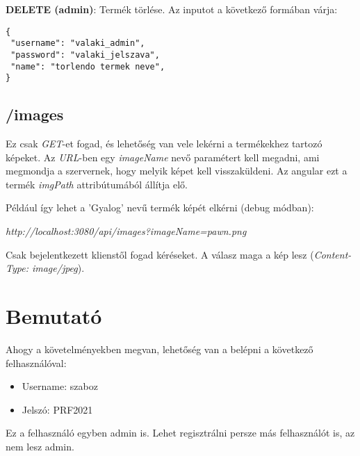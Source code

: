 \documentclass[]{article}
\begin{document}
\noindent
\textbf{DELETE (admin)}: Termék törlése. Az inputot a következő formában várja:

\bigskip
\begin{lstlisting}
{
 "username": "valaki_admin",
 "password": "valaki_jelszava",
 "name": "torlendo termek neve",
}
\end{lstlisting}

\subsection{/images}

Ez csak \textit{GET}-et fogad, és lehetőség van vele lekérni a termékekhez tartozó képeket. Az \textit{URL}-ben egy \textit{imageName} nevő paramétert kell megadni, ami megmondja a szervernek, hogy melyik képet kell visszaküldeni. Az angular ezt a termék \textit{imgPath} attribútumából állítja elő. 

Például így lehet a 'Gyalog' nevű termék képét elkérni (debug módban):

\bigskip
\begin{center}
	\textit{http://localhost:3080/api/images?imageName=pawn.png}
\end{center}
\bigskip

Csak bejelentkezett klienstől fogad kéréseket. A válasz maga a kép lesz (\textit{Content-Type: image/jpeg}). 

\section{Bemutató}

Ahogy a követelményekben megvan, lehetőség van a belépni a következő felhasználóval:

\begin{itemize}
	\item Username: szaboz
	\item Jelszó: PRF2021
\end{itemize}

Ez a felhasználó egyben admin is. Lehet regisztrálni persze más felhasználót is, az nem lesz admin.
\end{document}
